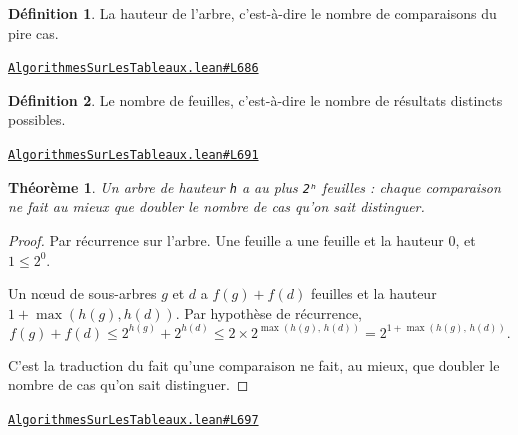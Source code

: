 \documentclass[11pt,a4paper]{article}
\theoremstyle{definition}
\newtheorem{definition}{Définition}
\theoremstyle{plain}
\newtheorem{theoreme}{Théorème}
\newcommand{\source}[2]{\par\smallskip\noindent\hfill{\footnotesize\href{#1}{\texttt{#2}}}\par\smallskip}
\begin{document}
\begin{definition}
La hauteur de l'arbre, c'est-à-dire le nombre de comparaisons du pire cas.
\end{definition}
\source{https://github.com/Commutator-IO/learn-lean/blob/main/courses/02-lycee/11-informatique-nsi/AlgorithmesSurLesTableaux.lean\#L686}{AlgorithmesSurLesTableaux.lean\#L686}

\begin{definition}
Le nombre de feuilles, c'est-à-dire le nombre de résultats distincts possibles.
\end{definition}
\source{https://github.com/Commutator-IO/learn-lean/blob/main/courses/02-lycee/11-informatique-nsi/AlgorithmesSurLesTableaux.lean\#L691}{AlgorithmesSurLesTableaux.lean\#L691}

\begin{theoreme}
Un arbre de hauteur \texttt{h} a au plus \texttt{2ʰ} feuilles : chaque comparaison ne fait au
mieux que doubler le nombre de cas qu'on sait distinguer.
\end{theoreme}
\begin{proof}
Par récurrence sur l'arbre. Une feuille a une feuille et la hauteur \(0\), et
\(1 \le 2^0\).

Un nœud de sous-arbres \(g\) et \(d\) a \(f(g) + f(d)\) feuilles et la hauteur
\(1 + \max(h(g), h(d))\). Par hypothèse de récurrence,
\[ f(g) + f(d) \le 2^{h(g)} + 2^{h(d)} \le 2 \times 2^{\max(h(g),\, h(d))}
   = 2^{1 + \max(h(g),\, h(d))} . \]

C'est la traduction du fait qu'une comparaison ne fait, au mieux, que doubler le nombre
de cas qu'on sait distinguer.
\end{proof}
\source{https://github.com/Commutator-IO/learn-lean/blob/main/courses/02-lycee/11-informatique-nsi/AlgorithmesSurLesTableaux.lean\#L697}{AlgorithmesSurLesTableaux.lean\#L697}
\end{document}
